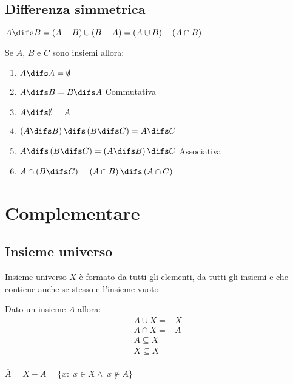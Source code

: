 \section{Differenza simmetrica}
\begin{defn}
	$A\difs B=\left(A-B\right)\cup\left(B-A\right)=\left(A\cup B\right)-\left(A\cap B\right)$
\end{defn}
{\centering
	
\par}
\begin{thm}
	Se $A$, $B$ e $C$ sono insiemi allora:
	\begin{enumerate}
		\item $A\difs A=\emptyset$
		\item $A\difs B=B\difs A$ Commutativa
		\item $A\difs\emptyset=A$
		\item $\left(A\difs B\right)\difs\left(B\difs C\right)=A\difs C$
		\item $A\difs\left(B\difs C\right)=\left(A\difs B\right)\difs C$ Associativa
		\item $A\cap\left(B\difs C\right)=\left(A\cap B\right)\difs\left(A\cap C\right)$
	\end{enumerate}
\end{thm}
\chapter{Complementare}
\section{Insieme universo}
\begin{defn}
Insieme universo $X$ è formato da tutti gli elementi, da tutti gli insiemi e che contiene anche se stesso e l'insieme vuoto.
\end{defn}
\begin{thm}
Dato un insieme $A$ allora:
\begin{align*}
A\cup X=& X\\
A\cap X=& A\\
A\subseteq X&\\
X\subseteq X&\\
\end{align*}
\end{thm}
\begin{defn}
$\overline{A}=X-A=\lbrace x:\; x\in X\wedge\; x\notin A\rbrace$
\end{defn}
